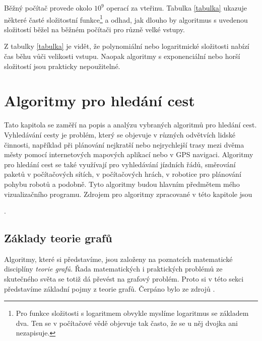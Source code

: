 \documentclass[12pt]{report}			%
\begin{document}
			Běžný počítač provede okolo $10^9$ operací za vteřinu. Tabulka \ref{tabulka} ukazuje některé časté složitostní funkce\footnote{Pro funkce složitosti s logaritmem obvykle myslíme logaritmus se základem dva. Ten se v počítačové vědě objevuje tak často, že se u něj dvojka ani nezapisuje.} a odhad, jak dlouho by algoritmus s uvedenou složitostí běžel na běžném počítači pro různě velké vstupy. %
			\cite{cerny}
			
			Z tabulky \ref{tabulka} je vidět, že polynomiální nebo logaritmické složitosti nabízí  čas běhu vůči velikosti vstupu. Naopak algoritmy s exponenciální nebo horší složitostí jsou prakticky nepoužitelné. %
			
				
		\chapter{Algoritmy pro hledání cest}
		Tato kapitola se zaměří na popis a analýzu vybraných algoritmů pro hledání cest. Vyhledávání cesty je problém, který se objevuje v různých odvětvích lidské činnosti, například při plánování nejkratší nebo nejrychlejší trasy mezi dvěma městy pomocí internetových mapových aplikací nebo v GPS navigaci. Algoritmy pro hledání cest se také využívají pro vyhledávání jízdních řádů, směrování paketů v počítačových sítích, v počítačových hrách, v robotice pro plánování pohybu robotů a podobně. Tyto algoritmy budou hlavním předmětem mého vizualizačního programu. Zdrojem pro algoritmy zpracované v této kapitole jsou \cite{intro,pruvodce,cerny,garg,felner,uhlik,simic,carlos,patel_intro}
		
		.
		
			\section{Základy teorie grafů}
			Algoritmy, které si představíme, jsou založeny na  poznatcích matematické disciplíny \emph{teorie grafů}. Řada matematických i praktických problémů ze skutečného světa se totiž dá převést na grafový problém. Proto si v této sekci představíme základní pojmy z teorie grafů. Čerpáno bylo ze zdrojů \cite{pruvodce} \cite{zaklady} \cite{intro} \cite{kovar}.
			
\end{document}
